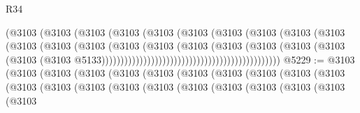 \begin{lexlean}{R34}
\begin{coremodule}
                                                      (@3103
                                                        (@3103
                                                          (@3103
                                                            (@3103
                                                              (@3103
                                                                (@3103
                                                                  (@3103
                                                                    (@3103
                                                                      (@3103
                                                                        (@3103
                                                                          (@3103
                                                                            (@3103
                                                                              (@3103
                                                                                (@3103
                                                                                  (@3103
                                                                                    (@3103
                                                                                      (@3103
                                                                                        (@3103
                                                                                          (@3103
                                                                                            (@3103
                                                                                              (@3103
                                                                                                (@3103
                                                                                                  @5133)))))))))))))))))))))))))))))))))))))))))))))))
@5229 := @3103
    (@3103
      (@3103
        (@3103
          (@3103
            (@3103
              (@3103
                (@3103
                  (@3103
                    (@3103
                      (@3103
                        (@3103
                          (@3103
                            (@3103
                              (@3103
                                (@3103
                                  (@3103
                                    (@3103
                                      (@3103
                                        (@3103
                                          (@3103
                                            (@3103

\end{coremodule}
\end{lexlean}

